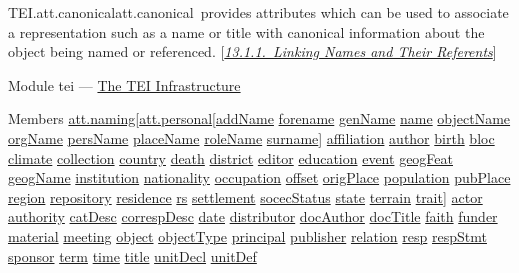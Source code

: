 \begin{reflist}
\item[]\begin{specHead}{TEI.att.canonical}{att.canonical} provides attributes which can be used to associate a representation such as a name or title with canonical information about the object being named or referenced. [\textit{\hyperref[NDATTSnr]{13.1.1.\ Linking Names and Their Referents}}]\end{specHead} 
    \item[{Module}]
  tei — \hyperref[ST]{The TEI Infrastructure}
    \item[{Members}]
  \hyperref[TEI.att.naming]{att.naming}[\hyperref[TEI.att.personal]{att.personal}[\hyperref[TEI.addName]{addName} \hyperref[TEI.forename]{forename} \hyperref[TEI.genName]{genName} \hyperref[TEI.name]{name} \hyperref[TEI.objectName]{objectName} \hyperref[TEI.orgName]{orgName} \hyperref[TEI.persName]{persName} \hyperref[TEI.placeName]{placeName} \hyperref[TEI.roleName]{roleName} \hyperref[TEI.surname]{surname}] \hyperref[TEI.affiliation]{affiliation} \hyperref[TEI.author]{author} \hyperref[TEI.birth]{birth} \hyperref[TEI.bloc]{bloc} \hyperref[TEI.climate]{climate} \hyperref[TEI.collection]{collection} \hyperref[TEI.country]{country} \hyperref[TEI.death]{death} \hyperref[TEI.district]{district} \hyperref[TEI.editor]{editor} \hyperref[TEI.education]{education} \hyperref[TEI.event]{event} \hyperref[TEI.geogFeat]{geogFeat} \hyperref[TEI.geogName]{geogName} \hyperref[TEI.institution]{institution} \hyperref[TEI.nationality]{nationality} \hyperref[TEI.occupation]{occupation} \hyperref[TEI.offset]{offset} \hyperref[TEI.origPlace]{origPlace} \hyperref[TEI.population]{population} \hyperref[TEI.pubPlace]{pubPlace} \hyperref[TEI.region]{region} \hyperref[TEI.repository]{repository} \hyperref[TEI.residence]{residence} \hyperref[TEI.rs]{rs} \hyperref[TEI.settlement]{settlement} \hyperref[TEI.socecStatus]{socecStatus} \hyperref[TEI.state]{state} \hyperref[TEI.terrain]{terrain} \hyperref[TEI.trait]{trait}] \hyperref[TEI.actor]{actor} \hyperref[TEI.authority]{authority} \hyperref[TEI.catDesc]{catDesc} \hyperref[TEI.correspDesc]{correspDesc} \hyperref[TEI.date]{date} \hyperref[TEI.distributor]{distributor} \hyperref[TEI.docAuthor]{docAuthor} \hyperref[TEI.docTitle]{docTitle} \hyperref[TEI.faith]{faith} \hyperref[TEI.funder]{funder} \hyperref[TEI.material]{material} \hyperref[TEI.meeting]{meeting} \hyperref[TEI.object]{object} \hyperref[TEI.objectType]{objectType} \hyperref[TEI.principal]{principal} \hyperref[TEI.publisher]{publisher} \hyperref[TEI.relation]{relation} \hyperref[TEI.resp]{resp} \hyperref[TEI.respStmt]{respStmt} \hyperref[TEI.sponsor]{sponsor} \hyperref[TEI.term]{term} \hyperref[TEI.time]{time} \hyperref[TEI.title]{title} \hyperref[TEI.unitDecl]{unitDecl} \hyperref[TEI.unitDef]{unitDef}

\end{reflist}
